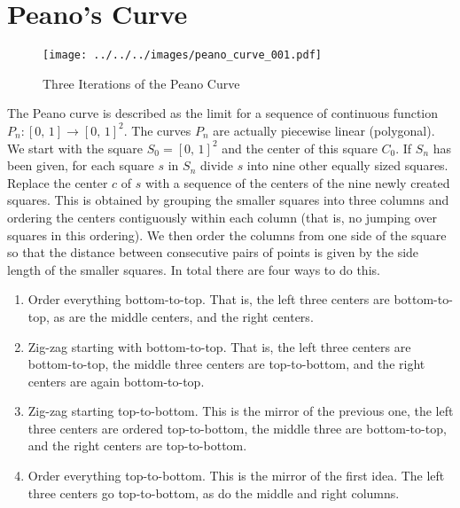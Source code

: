\documentclass{article}
\theoremstyle{plain}
\theoremstyle{normal}
\begin{document}
    \section{Peano's Curve}
        \begin{figure}
            \centering
            \texttt{[image: ../../../images/peano\_curve\_001.pdf]}
            \caption{Three Iterations of the Peano Curve}
            \label{fig:peano_curve_001}
        \end{figure}
        The Peano curve is described as the limit for a sequence of continuous
        function $P_{n}:[0,\,1]\rightarrow[0,\,1]^{2}$. The curves
        $P_{n}$ are actually piecewise linear (polygonal). We start with the
        square $S_{0}=[0,\,1]^{2}$ and the center of this square $C_{0}$.
        If $S_{n}$ has been given, for each square $s$ in $S_{n}$ divide
        $s$ into nine other equally sized squares. Replace the center $c$ of $s$
        with a sequence of the centers of the nine newly created squares.
        This is obtained by grouping the smaller squares into three columns
        and ordering the centers contiguously within each column (that is,
        no jumping over squares in this ordering). We then
        order the columns from one side of the square so that the
        distance between consecutive pairs of points is given by the side
        length of the smaller squares. In total there are four ways to do this.
        \begin{enumerate}
            \item Order everything bottom-to-top. That is, the left three
                centers are bottom-to-top, as are the middle centers, and the
                right centers.
            \item Zig-zag starting with bottom-to-top. That is, the left three
                centers are bottom-to-top, the middle three centers are
                top-to-bottom, and the right centers are again bottom-to-top.
            \item Zig-zag starting top-to-bottom. This is the mirror of the
                previous one, the left three centers are ordered top-to-bottom,
                the middle three are bottom-to-top, and the right centers are
                top-to-bottom.
            \item Order everything top-to-bottom. This is the mirror of the
                first idea. The left three centers go top-to-bottom, as do the
                middle and right columns.
        \end{enumerate}
\end{document}
